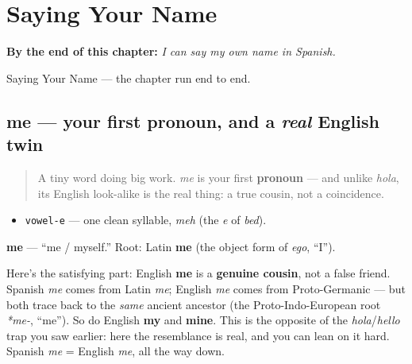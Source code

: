 
\chapter{Saying Your Name}
\label{ch:your-name}

\begin{chapteropening}
\textbf{By the end of this chapter:} \emph{I can say my own name in Spanish.}

Saying Your Name — the chapter run end to end.
\end{chapteropening}

\section[me]{me — your first pronoun, and a \emph{real} English twin}

\label{lesson:ES-C03-me}



\begin{quote}
A tiny word doing big work. \emph{me} is your first \textbf{pronoun} — and unlike \emph{hola}, its English look-alike is the real thing: a true cousin, not a coincidence.
\end{quote}

\begin{sounds}
\begin{itemize}
\raggedright
  \item \texttt{vowel-e} — one clean syllable, \emph{meh} (the \emph{e} of \emph{bed}).
\end{itemize}
\end{sounds}

\begin{cousinweb}
\textbf{me} — \textquotedblleft{}me / myself.\textquotedblright{} Root: Latin \textbf{me} (the object form of \emph{ego}, \textquotedblleft{}I\textquotedblright{}).

Here's the satisfying part: English \textbf{me} is a \textbf{genuine cousin}, not a false friend. Spanish \emph{me} comes from Latin \emph{me}; English \emph{me} comes from Proto-Germanic — but both trace back to the \emph{same} ancient ancestor (the Proto-Indo-European root \emph{*me-}, \textquotedblleft{}me\textquotedblright{}). So do English \textbf{my} and \textbf{mine}. This is the opposite of the \emph{hola}/\emph{hello} trap you saw earlier: here the resemblance is real, and you can lean on it hard. Spanish \emph{me} = English \emph{me}, all the way down.
\end{cousinweb}

